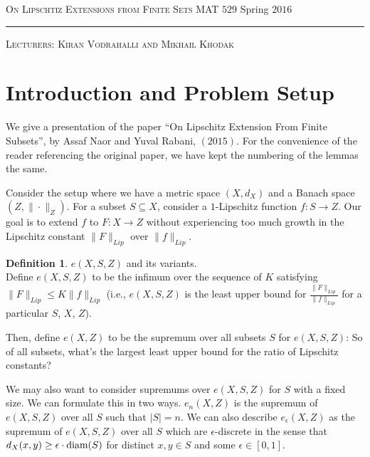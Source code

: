 \documentclass[10pt]{article}
\newtheorem{theorem}{Theorem}[section]
\newtheorem{lemma}[theorem]{Lemma}
\theoremstyle{definition}
\newtheorem{definition}[theorem]{Definition}
\theoremstyle{definition}
\newtheorem{example}[theorem]{Example}
\theoremstyle{definition}
\theoremstyle{definition}
\newcommand{\txt}[1]
{\textnormal{#1}}
\begin{document}
\noindent
\begin{minipage}[t]{1\columnwidth}%
\textsc{On Lipschtiz Extensions from Finite Sets}\hspace*{\fill} MAT $529$ Spring $2016$
\vspace{2mm}

\noindent \rule[0.5ex]{1\linewidth}{1pt}

\textsc{Lecturers: Kiran Vodrahalli and Mikhail Khodak}
\vspace{10mm}
\end{minipage}




\tableofcontents



\section{Introduction and Problem Setup}

We give a presentation of the paper ``On Lipschitz Extension From Finite Subsets'', by Assaf Naor and Yuval Rabani, $(2015)$. For the convenience of the reader referencing the original paper, we have kept the numbering of the lemmas the same.

Consider the setup where we have a metric space $(X, d_X)$ and a Banach space $(Z, \|\cdot\|_Z)$. For a subset $S \subseteq X$,
consider a $1$-Lipschitz function $f: S \to Z$. Our goal is to extend $f$ to $F:X \to Z$ without experiencing too much growth
in the Lipschitz constant $\|F\|_{Lip}$ over $\|f\|_{Lip}$. 

\begin{definition} $e(X, S, Z)$ and its variants. \\
Define $e(X, S, Z)$ to be the infimum over the sequence of $K$ satisfying
$\|F\|_{Lip} \leq K\|f\|_{Lip}$ (i.e., $e(X, S, Z)$ is the least upper bound for $\frac{\|F\|_{Lip}}{\|f\|_{Lip}}$ for a particular $S$, $X$, $Z$).

Then, define $e(X, Z)$ to be the supremum over all subsets $S$ for $e(X, S, Z)$: So of all subsets, what's the largest least upper bound for the ratio of Lipschitz constants? 

We may also want to consider supremums over $e(X, S, Z)$ for $S$ with a fixed size. We can formulate this in two ways.
$e_n(X, Z)$ is the supremum of $e(X, S, Z)$ over all $S$ such that $|S| = n$.
We can also describe $e_{\epsilon}(X, Z)$ as the supremum of $e(X, S, Z)$ over all $S$ which are $\epsilon$-discrete in the sense that $d_X(x, y) \geq \epsilon\cdot \txt{diam}(S)$ for distinct $x, y \in S$ and some $\epsilon \in [0, 1]$.
\end{definition}
\end{document}
